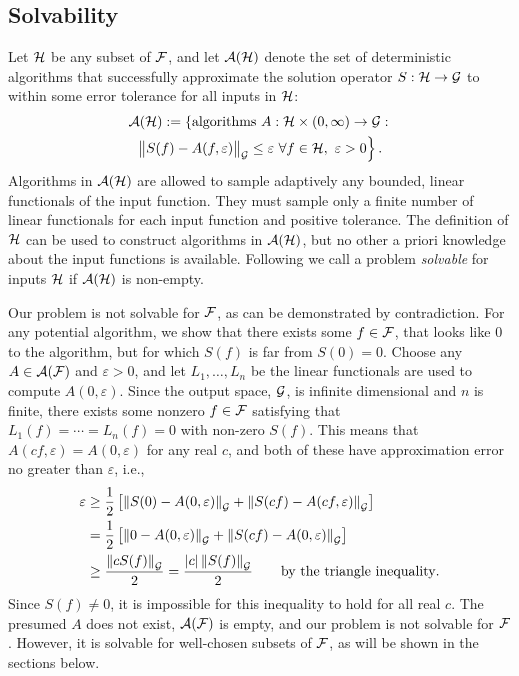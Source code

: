 \documentclass[graybox,footinfo]{svmult}
\newcommand{\DHJRnorm}[2][{}]{\ensuremath{\left \lVert #2 \right \rVert}_{#1}}
\newcommand{\DHJRbignorm}[2][{}]{\ensuremath{\bigl \lVert #2 \bigr \rVert}_{#1}}
\newcommand{\DHJRabs}[1]{\ensuremath{{\left \lvert #1 \right \rvert}}}
\begin{document}
\subsection{Solvability}  Let ${\mathcal{H}}$ be any subset of ${\mathcal{F}}$, and let ${\mathcal{A}}({\mathcal{H}})$ denote the set of deterministic algorithms that successfully approximate the solution operator $S : {\mathcal{H}} \to {\mathcal{G}}$ to within some error tolerance for all inputs in ${\mathcal{H}}$:
\begin{multline} \label{adapErrCrit}
\calA(\calH) : = \left\{ \text{algorithms } A:\calH \times (0,\infty) \rightarrow \calG : 
\right . \\ \left .
\DHJRbignorm[\calG]{S(f) - A(f,\varepsilon)} \le \varepsilon \ \forall f \in \calH, \ \varepsilon > 0 
\right \}.
\end{multline}
Algorithms in ${\mathcal{A}}({\mathcal{H}})$ are allowed to sample adaptively any bounded, linear functionals
of the input function.  They must sample only a finite number of linear functionals for each input function and positive tolerance.  The definition of ${\mathcal{H}}$ can be used to construct algorithms in ${\mathcal{A}}({\mathcal{H}})$, but no other a priori knowledge about the input functions is available.  Following \cite{KunEtal19a} we call a problem \emph{solvable} for inputs ${\mathcal{H}}$ if ${\mathcal{A}}({\mathcal{H}})$ is non-empty.

Our problem is not solvable for ${\mathcal{F}}$, as can be demonstrated by contradiction. For any potential algorithm, we show that there exists some $f \in {\mathcal{F}}$, that looks like $0$ to the algorithm, but for which $S(f)$ is far from $S(0) = 0$.   Choose any $A \in {\mathcal{A}}({\mathcal{F}})$ and $\varepsilon > 0$, and let $L_1, \ldots, L_n$ be the linear functionals are used to compute $A(0,\varepsilon)$. Since the output space, ${\mathcal{G}}$, is infinite dimensional and $n$ is finite, there exists some nonzero $f \in {\mathcal{F}}$ satisfying that $L_1(f) = \cdots = L_n(f) = 0$ with non-zero $S(f)$. This means that $A(cf,\varepsilon) = A(0,\varepsilon)$ for any real $c$, and both of these have approximation error no greater than $\varepsilon$, i.e.,
\begin{align*}
    \varepsilon &\ge \frac 12 \left[ \DHJRnorm[\calG]{S(0) - A(0,\varepsilon)} + \DHJRnorm[\calG]{S(cf) - A(cf,\varepsilon)}\right] \\
    & =  \frac 12 \left[ \DHJRnorm[\calG]{0 - A(0,\varepsilon)} + \DHJRnorm[\calG]{S(cf) - A(0,\varepsilon)}\right] \\
    & \ge  \frac {\DHJRnorm[\calG]{cS(f)}}2 = \frac {\DHJRabs{c}\DHJRnorm[\calG]{S(f)}}2  \qquad \text{by the triangle inequality}.
\end{align*}
Since $S(f) \ne 0$, it is impossible for this inequality to hold for all real $c$.  The presumed $A$ does not exist, ${\mathcal{A}}({\mathcal{F}})$ is empty, and our problem is not solvable for ${\mathcal{F}}$. However, it is solvable for well-chosen subsets of ${\mathcal{F}}$, as will be shown in the sections below.
\end{document}
